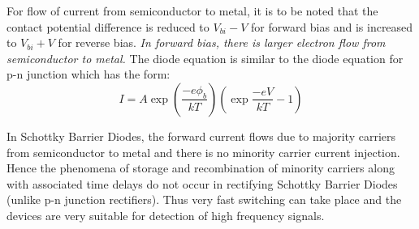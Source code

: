 \begin{frame}
  For flow of current from semiconductor to metal, it is to be noted that the contact potential difference is reduced to $V_{bi} - V$ for forward bias and is increased to $V_{bi} + V$ for reverse bias. \emph{In forward bias, there is larger electron flow from semiconductor to metal.}
  The diode equation is similar to the diode equation for p-n junction which has the form:
  \[ I = A \exp \left(\frac{-e\phi_b}{kT}\right) \left( \exp \frac{-eV}{kT} -1 \right) \]
\end{frame}

\begin{frame}
  In Schottky Barrier Diodes, the forward current flows due to majority carriers from semiconductor to metal and there is no minority carrier current injection. Hence the phenomena of storage and recombination of minority carriers along with associated time delays do not occur in rectifying Schottky Barrier Diodes (unlike p-n junction rectifiers). Thus very fast switching can take place and the devices are very suitable for detection of high frequency signals.
\end{frame}
